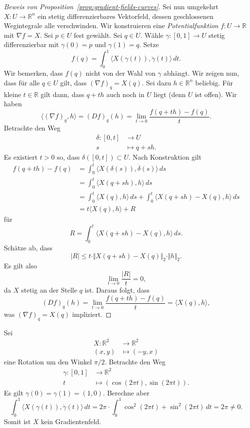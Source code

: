 \documentclass[../main.tex]{subfiles}
\begin{document}
\begin{proof}[Beweis von Proposition~\ref{prop:gradient-fields-curves}]
  Sei nun umgekehrt $X \colon U \to \mathbb{R}^n$
  ein stetig differenzierbares Vektorfeld, dessen geschlossenen
  Wegintegrale alle verschwinden.
  Wir konstruieren eine \emph{Potentialfunktion}
  $f \colon U \to \mathbb{R}$ mit $\nabla f = X$.
  Sei $p \in U $ fest gewählt.
  Sei $q \in U$.
  Wähle $\gamma \colon [0, 1] \to U$ stetig differenzierbar
  mit $\gamma(0) = p$ und $\gamma(1) = q$.
  Setze
   \[
     f(q) = \int_{0}^{1} \langle X(\gamma(t)), \dot \gamma(t) \rangle \, dt.
  \]
  Wir bemerken, dass $f(q)$ nicht von der Wahl von $\gamma$ abhängt.
  Wir zeigen nun, dass für alle $q \in U$ gilt,
  dass ${(\nabla f)}_q = X(q)$.
  Sei dazu $h \in \mathbb{R}^n$ beliebig.
  Für kleine $t \in \mathbb{R}$ gilt dann, dass $q + th$
  auch noch in $U$ liegt (denn $U$ ist offen).
  Wir haben
  \[
    \langle {(\nabla f)}_q, h \rangle
    = {(Df)}_q(h) = \lim_{t \to 0} \frac{f(q + th) - f(q)}{t}.
  \]
  Betrachte den Weg
  \begin{align*}
    \delta \colon [0, t] & \to U \\
    s & \mapsto q + sh.
  \end{align*}
  Es existiert $t > 0$ so, dass $\delta([0, t]) \subset U$.
  Nach Konstruktion gilt
  \begin{align*}
     f(q + th) - f(q)
     &=\int_{0}^{t} \langle X(\delta(s)), \dot \delta(s) \rangle \, ds  \\
     &= \int_{0}^{t} \langle X(q + sh), h \rangle \, ds \\
     &= \int_{0}^{t} \langle X(q), h \rangle \, ds
     + \int_{0}^{t} \langle X(q + sh) - X(q), h \rangle \, ds \\
     &= t \langle X(q), h \rangle + R
  \end{align*}
  für
  \[
    R = \int_{0}^{t} \langle X(q + sh) - X(q), h \rangle \, ds.
  \]
  Schätze ab, dass
  \[
    |R| \leq t \cdot \Vert X (q + sh) - X(q) \Vert_2 \cdot \Vert h \Vert_2.
  \]
  Es gilt also
  \[
    \lim_{t \to 0} \frac{|R|}{t} = 0,
  \]
  da $X$ stetig an der Stelle $q$ ist.
  Daraus folgt, dass
  \[
    {(Df)}_q (h) = \lim_{t \to 0} \frac{f(q + th) - f(q)}{t}
    = \langle X(q), h \rangle,
  \]
  was ${(\nabla f)}_q = X(q)$ impliziert.
\end{proof}

\begin{example}
  Sei
  \begin{align*}
    X \colon \mathbb{R}^2 & \to \mathbb{R}^2 \\
    (x, y) & \mapsto (-y, x)
  \end{align*}
  eine Rotation um den Winkel $\pi/2$.
  Betrachte den Weg
  \begin{align*}
    \gamma \colon [0, 1] & \to \mathbb{R}^2 \\
    t & \mapsto (\cos(2 \pi t), \sin(2 \pi t)).
  \end{align*}
  Es gilt $\gamma(0) = \gamma(1) = (1, 0)$.
  Berechne aber
  \[
    \int_{0}^{1} \langle X(\gamma(t)), \dot \gamma(t) \rangle \, dt
    = 2\pi \cdot \int_{0}^{1} \cos^2(2 \pi t) + \sin^2(2 \pi t) \, dt
    = 2 \pi \neq 0.
  \]
  Somit ist $X$ kein Gradientenfeld.
\end{example}
\end{document}
